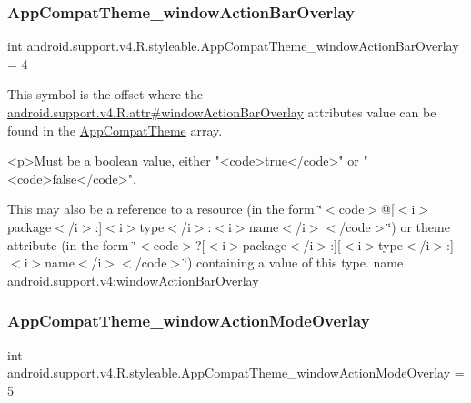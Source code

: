 \subsubsection{\texorpdfstring{App\+Compat\+Theme\+\_\+window\+Action\+Bar\+Overlay}{AppCompatTheme\_windowActionBarOverlay}}
{\footnotesize\ttfamily int android.\+support.\+v4.\+R.\+styleable.\+App\+Compat\+Theme\+\_\+window\+Action\+Bar\+Overlay = 4\hspace{0.3cm}{\ttfamily [static]}}

This symbol is the offset where the \hyperlink{classandroid_1_1support_1_1v4_1_1R_1_1attr_a367af79f12a7d7ea5d9c5a55e0f1c09b}{android.\+support.\+v4.\+R.\+attr\#window\+Action\+Bar\+Overlay} attribute\textquotesingle{}s value can be found in the \hyperlink{classandroid_1_1support_1_1v4_1_1R_1_1styleable_ac07ebbe62ed977f6dcaadc6397840ace}{App\+Compat\+Theme} array.

\begin{DoxyVerb}      <p>Must be a boolean value, either "<code>true</code>" or "<code>false</code>".
\end{DoxyVerb}
 

This may also be a reference to a resource (in the form \char`\"{}$<$code$>$@\mbox{[}$<$i$>$package$<$/i$>$\+:\mbox{]}$<$i$>$type$<$/i$>$\+:$<$i$>$name$<$/i$>$$<$/code$>$\char`\"{}) or theme attribute (in the form \char`\"{}$<$code$>$?\mbox{[}$<$i$>$package$<$/i$>$\+:\mbox{]}\mbox{[}$<$i$>$type$<$/i$>$\+:\mbox{]}$<$i$>$name$<$/i$>$$<$/code$>$\char`\"{}) containing a value of this type.  name android.\+support.\+v4\+:window\+Action\+Bar\+Overlay \mbox{\label{classandroid_1_1support_1_1v4_1_1R_1_1styleable_a90589f30809f60bc8783dde73bb5e9f1}} 
\subsubsection{\texorpdfstring{App\+Compat\+Theme\+\_\+window\+Action\+Mode\+Overlay}{AppCompatTheme\_windowActionModeOverlay}}
{\footnotesize\ttfamily int android.\+support.\+v4.\+R.\+styleable.\+App\+Compat\+Theme\+\_\+window\+Action\+Mode\+Overlay = 5\hspace{0.3cm}{\ttfamily [static]}}

